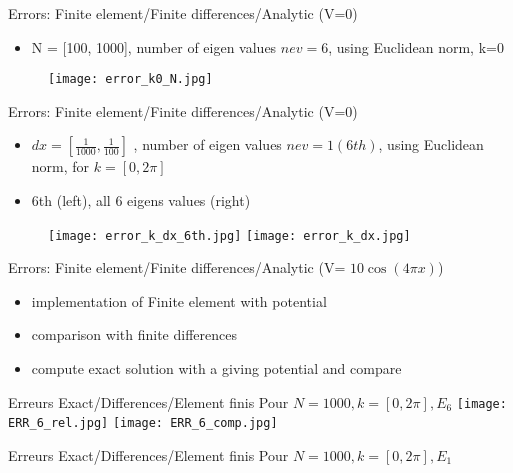 \documentclass{beamer}
\begin{document}
\begin{frame}{Errors: Finite element/Finite differences/Analytic (V=0)}
\begin{itemize}
    \item N = [100, 1000], number of eigen values $nev=6$, using Euclidean norm, k=0
\end{itemize}
 \begin{figure}
    \texttt{[image: error\_k0\_N.jpg]} 
\end{figure} 
\end{frame}


\begin{frame}{Errors: Finite element/Finite differences/Analytic (V=0)}
\begin{itemize}
    \item $dx=[\frac{1}{1000},\frac{1}{100}]$ ,  number of eigen values $nev=1 (6th) $, using Euclidean norm, for $k=[0,2\pi]$
    \item 6th (left), all 6 eigens values (right)
\end{itemize}
 \begin{figure}
    \texttt{[image: error\_k\_dx\_6th.jpg]} 
    \texttt{[image: error\_k\_dx.jpg]} 
\end{figure} 
\end{frame}



\begin{frame}{Errors: Finite element/Finite differences/Analytic (V= $10\cos(4 \pi x)$)}
    \begin{itemize}
        \item implementation of Finite element with potential
        \item comparison with finite differences
        \item compute exact solution with a giving potential and compare
    \end{itemize}
\end{frame}


\begin{frame}{Erreurs Exact/Differences/Element finis}
Pour $N=1000, k=[0,2\pi], E_6$
\texttt{[image: ERR\_6\_rel.jpg]} 
 \texttt{[image: ERR\_6\_comp.jpg]} 
\end{frame}

\begin{frame}{Erreurs Exact/Differences/Element finis}
Pour $N=1000, k=[0,2\pi], E_1$
   
\end{frame}
\end{document}

